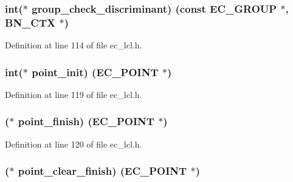 \subsubsection[{\texorpdfstring{group\+\_\+check\+\_\+discriminant}{group_check_discriminant}}]{\setlength{\rightskip}{0pt plus 5cm}int($\ast$ group\+\_\+check\+\_\+discriminant) (const {\bf E\+C\+\_\+\+G\+R\+O\+UP} $\ast$, {\bf B\+N\+\_\+\+C\+TX} $\ast$)}\hypertarget{structec__method__st_a9b8420c7993b639854fea6cd647dc099}{}\label{structec__method__st_a9b8420c7993b639854fea6cd647dc099}


Definition at line 114 of file ec\+\_\+lcl.\+h.

\subsubsection[{\texorpdfstring{point\+\_\+init}{point_init}}]{\setlength{\rightskip}{0pt plus 5cm}int($\ast$ point\+\_\+init) ({\bf E\+C\+\_\+\+P\+O\+I\+NT} $\ast$)}\hypertarget{structec__method__st_abde6e8aebd34176fe9309bf0c7d1903d}{}\label{structec__method__st_abde6e8aebd34176fe9309bf0c7d1903d}


Definition at line 119 of file ec\+\_\+lcl.\+h.

\subsubsection[{\texorpdfstring{point\+\_\+finish}{point_finish}}]{($\ast$ point\+\_\+finish) ({\bf E\+C\+\_\+\+P\+O\+I\+NT} $\ast$)}\hypertarget{structec__method__st_ae208c9fe446f677c9e052e05c11f609b}{}\label{structec__method__st_ae208c9fe446f677c9e052e05c11f609b}


Definition at line 120 of file ec\+\_\+lcl.\+h.

\subsubsection[{\texorpdfstring{point\+\_\+clear\+\_\+finish}{point_clear_finish}}]{($\ast$ point\+\_\+clear\+\_\+finish) ({\bf E\+C\+\_\+\+P\+O\+I\+NT} $\ast$)}\hypertarget{structec__method__st_aa133b0ec8ec4a72b691450457164490a}{}\label{structec__method__st_aa133b0ec8ec4a72b691450457164490a}


